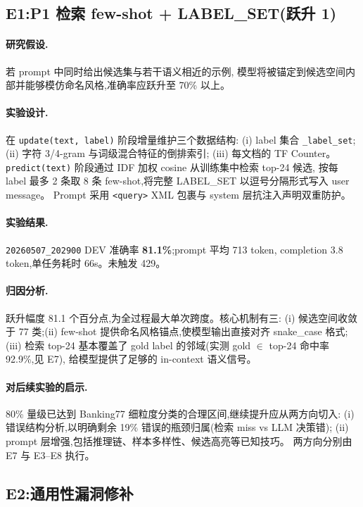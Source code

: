 \documentclass[11pt,a4paper]{ctexart}
\begin{document}
\subsection{E1:P1 检索 few-shot + LABEL\_SET(跃升 1)}

\paragraph{研究假设.}若 prompt 中同时给出候选集与若干语义相近的示例,
模型将被锚定到候选空间内部并能够模仿命名风格,准确率应跃升至 70\% 以上。

\paragraph{实验设计.}在 \texttt{update(text,\,label)} 阶段增量维护三个数据结构:
(i) label 集合 \texttt{\_label\_set};(ii) 字符 3/4-gram 与词级混合特征的倒排索引;
(iii) 每文档的 TF Counter。
\texttt{predict(text)} 阶段通过 IDF 加权 cosine 从训练集中检索 top-24 候选,
按每 label 最多 2 条取 8 条 few-shot,将完整 LABEL\_SET 以逗号分隔形式写入 user message。
Prompt 采用 \texttt{<query>} XML 包裹与 system 层抗注入声明双重防护。

\paragraph{实验结果.}\texttt{20260507\_202900} DEV 准确率 \textbf{81.1\%};prompt 平均 713 token,
completion 3.8 token,单任务耗时 66s。未触发 429。

\paragraph{归因分析.}跃升幅度 81.1 个百分点,为全过程最大单次跨度。核心机制有三:
(i) 候选空间收敛于 77 类;(ii) few-shot 提供命名风格锚点,使模型输出直接对齐 snake\_case 格式;
(iii) 检索 top-24 基本覆盖了 gold label 的邻域(实测 gold $\in$ top-24 命中率 92.9\%,见 E7),
给模型提供了足够的 in-context 语义信号。

\paragraph{对后续实验的启示.}80\% 量级已达到 Banking77 细粒度分类的合理区间,继续提升应从两方向切入:
(i) 错误结构分析,以明确剩余 19\% 错误的瓶颈归属(检索 miss vs LLM 决策错);
(ii) prompt 层增强,包括推理链、样本多样性、候选高亮等已知技巧。
两方向分别由 E7 与 E3--E8 执行。

\subsection{E2:通用性漏洞修补}
\end{document}
